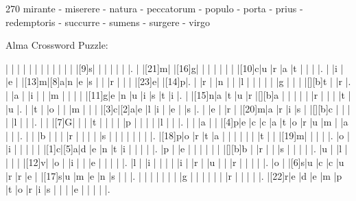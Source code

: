 \documentclass[12pt]{article}
\begin{document}
\pagestyle{fancy}
\fancyhf{}
\renewcommand{\headrulewidth}{0pt} %
  \renewcommand{\footrulewidth}{0pt}
\libertine
\renewcommand\PuzzleClueFont{\rm\normalsize}
\noindent\begin{rotate}{0}
\small 
\end{rotate}
\hfill
\begin{rotate}{270}
\small \quad mirante - miserere - natura - peccatorum - populo - porta - prius - redemptoris - succurre - sumens - surgere - virgo
\end{rotate}
\begin{center}
  \huge{Alma Crossword Puzzle:}
\end{center}
\vspace{1.5cm}
\begin{Puzzle}{20}{20}
  |{}  |{}  |{}  |{}  |{}  |{}  |{}  |{}  |{}  |{}  |{}  |{}  |[9]s|{}  |{}  |{}  |{}  |{}  |{}  |.
  |{}  |[21]m|{}  |[16]g|{}  |{}  |{}  |{}  |{}  |{}  |{}  |[10]c|u   |r   |a   |t   |{}  |{}  |{}  |.
  |{}  |i   |{}  |e   |{}  |[13]m|[8]a|n   |e   |s   |{}  |{}  |r   |{}  |{}  |{}  |[23]e|{}  |[14]p|.
  |{}  |r   |{}  |n   |{}  |{}  |l   |{}  |{}  |{}  |{}  |{}  |g   |{}  |{}  |{}  |[][b]t   |{}  |r   |.
  |{}  |a   |{}  |i   |{}  |{}  |m   |{}  |{}  |{}  |{}  |[11]g|e   |n   |u   |i   |s   |t   |i   |.
  |{}  |[15]n|a   |t   |u   |r   |[][b]a   |{}  |{}  |{}  |{}  |{}  |r   |{}  |{}  |{}  |t   |{}  |u   |.
  |{}  |t   |{}  |o   |{}  |{}  |m   |{}  |{}  |{}  |[3]c|[2]a|e   |l   |i   |{}  |e   |{}  |s   |.
  |{}  |e   |{}  |r   |{}  |[20]m|a   |r   |i   |s   |{}  |[][b]c   |{}  |{}  |{}  |{}  |l   |{}  |{}  |.
  |{}  |{}  |[7]G|{}  |{}  |{}  |t   |{}  |{}  |{}  |{}  |p   |{}  |{}  |{}  |{}  |l   |{}  |{}  |.
  |{}  |{}  |a   |{}  |{}  |[4]p|e   |c   |c   |a   |t   |o   |r   |u   |m   |{}  |a   |{}  |{}  |.
  |{}  |{}  |b   |{}  |{}  |{}  |r   |{}  |{}  |{}  |{}  |s   |{}  |{}  |{}  |{}  |{}  |{}  |{}  |.
  |[18]p|o   |r   |t   |a   |{}  |{}  |{}  |{}  |{}  |{}  |t   |{}  |{}  |[19]m|{}  |{}  |{}  |{}  |.
  |o   |{}  |i   |{}  |{}  |{}  |{}  |{}  |[1]c|[5]a|d   |e   |n   |t   |i   |{}  |{}  |{}  |{}  |.
  |p   |{}  |e   |{}  |{}  |{}  |{}  |{}  |{}  |[][b]b   |{}  |r   |{}  |{}  |s   |{}  |{}  |{}  |{}  |.
  |u   |{}  |l   |{}  |{}  |{}  |{}  |[12]v|{}  |o   |{}  |i   |{}  |{}  |e   |{}  |{}  |{}  |{}  |.
  |l   |{}  |i   |{}  |{}  |{}  |{}  |i   |{}  |r   |{}  |u   |{}  |{}  |r   |{}  |{}  |{}  |{}  |.
  |o   |{}  |[6]s|u   |c   |c   |u   |r   |r   |e   |{}  |[17]s|u   |m   |e   |n   |s   |{}  |{}  |.
  |{}  |{}  |{}  |{}  |{}  |{}  |{}  |g   |{}  |{}  |{}  |{}  |{}  |{}  |r   |{}  |{}  |{}  |{}  |.
  |[22]r|e   |d   |e   |m   |p   |t   |o   |r   |i   |s   |{}  |{}  |{}  |e   |{}  |{}  |{}  |{}  |.
\end{Puzzle}
\end{document}
